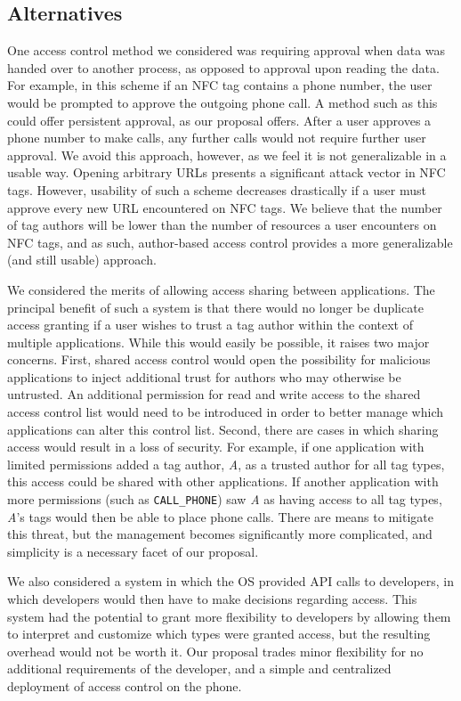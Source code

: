 \documentclass[12pt]{article}
\begin{document}
\subsection{Alternatives}
One access control method we considered was requiring approval when data was handed over to another process, as opposed to approval upon reading the data.
For example, in this scheme if an NFC tag contains a phone number, the user would be prompted to approve the outgoing phone call.
A method such as this could offer persistent approval, as our proposal offers.
After a user approves a phone number to make calls, any further calls would not require further user approval.
We avoid this approach, however, as we feel it is not generalizable in a usable way.
Opening arbitrary URLs presents a significant attack vector in NFC tags.
However, usability of such a scheme decreases drastically if a user must approve every new URL encountered on NFC tags.
We believe that the number of tag authors will be lower than the number of resources a user encounters on NFC tags, and as such, author-based access control provides a more generalizable (and still usable) approach.

We considered the merits of allowing access sharing between applications.
The principal benefit of such a system is that there would no longer be duplicate access granting if a user wishes to trust a tag author within the context of multiple applications.
While this would easily be possible, it raises two major concerns.
First, shared access control would open the possibility for malicious applications to inject additional trust for authors who may otherwise be untrusted.
An additional permission for read and write access to the shared access control list would need to be introduced in order to better manage which applications can alter this control list.
Second, there are cases in which sharing access would result in a loss of security.
For example, if one application with limited permissions added a tag author, \textit{A}, as a trusted author for all tag types, this access could be shared with other applications.
If another application with more permissions (such as \texttt{CALL\_PHONE}) saw \textit{A} as having access to all tag types, \textit{A}'s tags would then be able to place phone calls.
There are means to mitigate this threat, but the management becomes significantly more complicated, and simplicity is a necessary facet of our proposal.

We also considered a system in which the OS provided API calls to developers, in which developers would then have to make decisions regarding access.
This system had the potential to grant more flexibility to developers by allowing them to interpret and customize which types were granted access, but the resulting overhead would not be worth it.
Our proposal trades minor flexibility for no additional requirements of the developer, and a simple and centralized deployment of access control on the phone.
\end{document}
